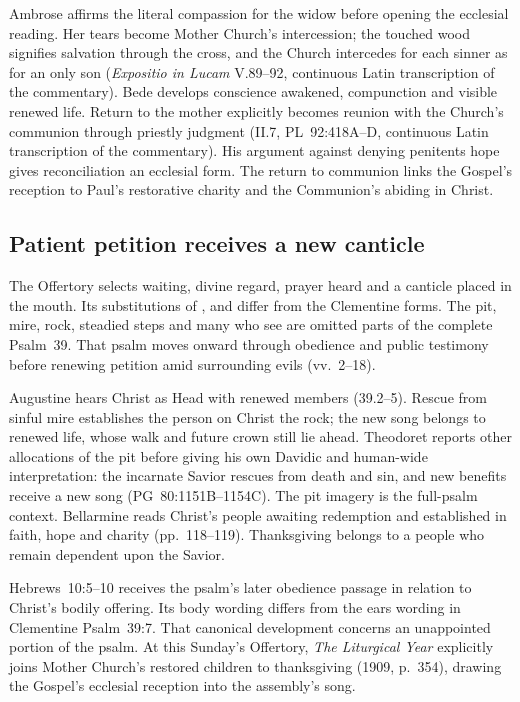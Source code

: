 Ambrose affirms the literal compassion for the widow before opening the
ecclesial reading. Her tears become Mother Church's intercession; the
touched wood signifies salvation through the cross, and the Church
intercedes for each sinner as for an only son (\emph{Expositio in Lucam}
V.89--92, continuous Latin transcription of the commentary). Bede develops
conscience awakened, compunction and visible renewed life. Return to the
mother explicitly becomes reunion with the Church's communion through
priestly judgment (II.7, PL~92:418A--D, continuous Latin transcription of
the commentary). His argument
against denying penitents hope gives reconciliation an ecclesial form.
The return to communion links the Gospel's reception to Paul's
restorative charity and the Communion's abiding in Christ.

\subsection*{Patient petition receives a new canticle\enspace{}}

The Offertory selects waiting, divine regard, prayer heard and a canticle
placed in the mouth. Its substitutions of ,
 and  differ from the Clementine
forms. The pit, mire, rock, steadied steps and many who see are omitted
parts of the complete Psalm~39. That psalm moves onward through obedience
and public testimony before renewing petition amid surrounding evils
(vv.~2--18).

Augustine hears Christ as Head with renewed members (39.2--5).
Rescue from sinful mire establishes the person on Christ the rock; the new
song belongs to renewed life, whose walk and future crown still lie ahead.
Theodoret reports other allocations of the pit before giving his own
Davidic and human-wide interpretation: the incarnate Savior rescues from
death and sin, and new benefits receive a new song
(PG~80:1151B--1154C). The pit imagery is the full-psalm context.
Bellarmine reads Christ's people awaiting redemption and established in
faith, hope and charity (pp.~118--119). Thanksgiving belongs to a people
who remain dependent upon the Savior.

Hebrews~10:5--10 receives the psalm's later obedience passage in relation
to Christ's bodily offering. Its body wording differs from the ears wording
in Clementine Psalm~39:7. That canonical development concerns an unappointed
portion of the psalm. At this Sunday's Offertory, \emph{The Liturgical
Year} explicitly joins Mother Church's restored children to thanksgiving
(1909, p.~354), drawing the Gospel's ecclesial reception into the assembly's
song.

